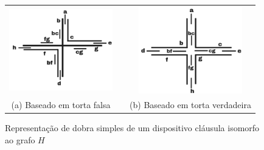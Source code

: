\begin{figure}[htb]
  \centering
  \begin{tabular}{c c c }
    \includegraphics[width=4.5cm]{./img/falsePie.png}  %
    & &\includegraphics[width=4.5cm]{./img/truePie.png} %
    \\%
    {\footnotesize (a) Baseado em torta falsa}  & &  {\footnotesize(b) Baseado em torta verdadeira}\\
  \end{tabular}
  \caption{Representação de dobra simples  de um dispositivo cláusula isomorfo ao grafo $H$} \label{fig:falseAndTruePie}
\end{figure} 